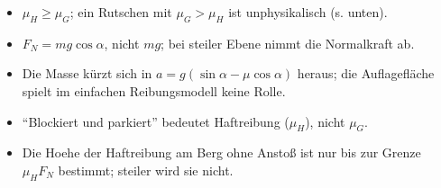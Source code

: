 \begin{achtung}
\begin{itemize}
  \item $\mu_H\ge\mu_G$; ein Rutschen mit $\mu_G>\mu_H$ ist unphysikalisch
        (s. unten).
  \item $F_N=mg\cos\alpha$, nicht $mg$; bei steiler Ebene nimmt die
        Normalkraft ab.
  \item Die Masse kürzt sich in $a=g(\sin\alpha-\mu\cos\alpha)$ heraus;
        die Auflagefläche spielt im einfachen Reibungsmodell keine Rolle.
  \item ``Blockiert und parkiert'' bedeutet Haftreibung ($\mu_H$), nicht
        $\mu_G$.
  \item Die Hoehe der Haftreibung am Berg ohne Ansto\ss{} ist nur bis zur
        Grenze $\mu_HF_N$ bestimmt; steiler wird sie nicht.
\end{itemize}
\end{achtung}
